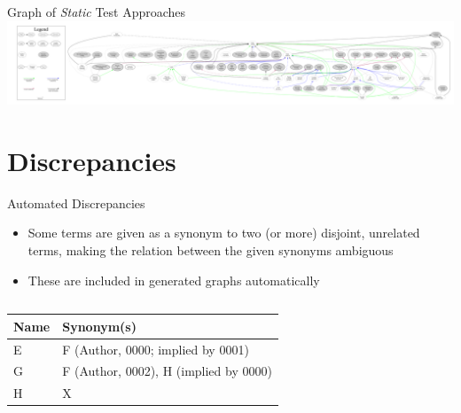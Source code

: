 \documentclass{beamer}
\begin{document}
\begin{frame}{Graph of \emph{Static} Test Approaches}
    \includegraphics[width=\textwidth]{assets/graphs/staticGraph.pdf}
\end{frame}

\section{Discrepancies}
\begin{frame}{Automated Discrepancies}
    \begin{itemize}
        \item Some terms are given as a synonym to two (or more) disjoint,
              unrelated terms, making the relation between the given synonyms
              ambiguous \pause
        \item These are included in generated graphs automatically
    \end{itemize}
    \vspace{-0.5cm}
    \begin{columns}[c]
        \begin{column}{.55\textwidth}
            \small
            \begin{table}[hbtp!]
                \centering
                \begin{tabular}{ll} \hline
                    Name & Synonym(s)                            \\ \hline
                    E    & F (Author, 0000; implied by 0001)     \\
                    G    & F (Author, 0002), H (implied by 0000) \\
                    H    & X                                     \\ \hline
                \end{tabular}
            \end{table}
        \end{column}
        \begin{column}{.4\textwidth}

\end{column}
\end{columns}
\end{frame}
\end{document}
